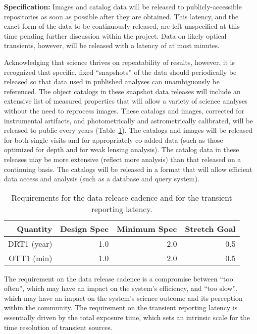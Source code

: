 \textbf{Specification:} Images and catalog data will be released to
publicly-accessible repositories as soon as possible after they are
obtained. This latency, and the exact form of the data to be continuously
released, are left unspecified at this time pending further discussion
within the project. Data on likely optical transients, however, will be
released with a latency of at most
minutes.

Acknowledging that science thrives on repeatability of results, however, it
is recognized that specific, fixed ``snapshots'' of the data should
periodically be released so that data used in published analyses can
unambiguously be referenced. The object catalogs in these snapshot data
releases will include an extensive list of measured properties that will
allow a variety of science analyses without the need to reprocess
images. These catalogs and images, corrected for instrumental artifacts,
and photometrically and astrometrically calibrated, will be released to
public every
years (Table~\ref{TDMcadence}). The catalogs and images will be released
for both single visits and for appropriately co-added data (such as those
optimized for depth and for weak lensing analysis). The catalog data in
these releases may be more extensive (\ie reflect more analysis)
than that released on a continuing basis. The catalogs will be released in
a format that will allow efficient data access and analysis (such as a
database and query system).

\begin{table}[h]
\begin{tabular}{|r|r|r|r|}
\hline
     Quantity         &   Design Spec & Minimum Spec  & Stretch Goal   \\
\hline
    DRT1 (year)       &       1.0     &      2.0      &       0.5     \\
    OTT1 (min)        &       1.0     &      2.0      &       0.5     \\
\hline
\end{tabular}
\caption{Requirements for the data release cadence and for the transient
reporting latency.}
\label{TDMcadence}
\end{table}

The requirement on the data release cadence is a compromise between ``too
often'', which may have an impact on the system's efficiency, and ``too
slow'', which may have an impact on the system's science outcome and its
perception within the community.  The requirement on the transient
reporting latency is essentially driven by the total exposure time, which
sets an intrinsic scale for the time resolution of transient sources.

